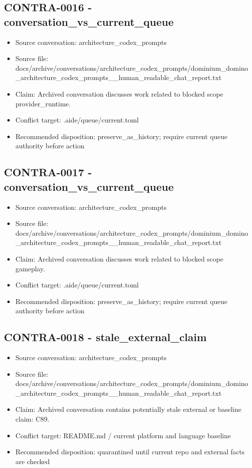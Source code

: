 \documentclass[11pt,a4paper]{report}
\begin{document}
\subsection{CONTRA-0016 - conversation\_vs\_current\_queue}

\begin{itemize}
\item Source conversation: architecture\_codex\_prompts
\item Source file: docs/archive/conversations/architecture\_codex\_prompts/dominium\_domino\_architecture\_codex\_prompts\_\_human\_readable\_chat\_report.txt
\item Claim: Archived conversation discusses work related to blocked scope provider\_runtime.
\item Conflict target: .aide/queue/current.toml
\item Recommended disposition: preserve\_as\_history; require current queue authority before action
\end{itemize}

\subsection{CONTRA-0017 - conversation\_vs\_current\_queue}

\begin{itemize}
\item Source conversation: architecture\_codex\_prompts
\item Source file: docs/archive/conversations/architecture\_codex\_prompts/dominium\_domino\_architecture\_codex\_prompts\_\_human\_readable\_chat\_report.txt
\item Claim: Archived conversation discusses work related to blocked scope gameplay.
\item Conflict target: .aide/queue/current.toml
\item Recommended disposition: preserve\_as\_history; require current queue authority before action
\end{itemize}

\subsection{CONTRA-0018 - stale\_external\_claim}

\begin{itemize}
\item Source conversation: architecture\_codex\_prompts
\item Source file: docs/archive/conversations/architecture\_codex\_prompts/dominium\_domino\_architecture\_codex\_prompts\_\_human\_readable\_chat\_report.txt
\item Claim: Archived conversation contains potentially stale external or baseline claim: C89.
\item Conflict target: README.md / current platform and language baseline
\item Recommended disposition: quarantined until current repo and external facts are checked
\end{itemize}
\end{document}
